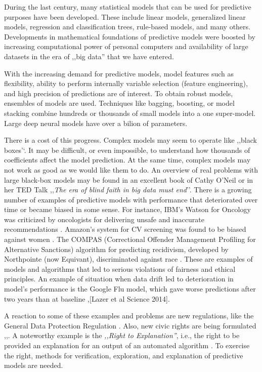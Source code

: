 \documentclass[12pt,]{krantz}
\theoremstyle{definition}
\theoremstyle{definition}
\theoremstyle{definition}
\theoremstyle{remark}
\begin{document}
During the last century, many statistical models that can be used for
predictive purposes have been developed. These include linear models,
generalized linear models, regression and classification trees,
rule-based models, and many others. Developments in mathematical
foundations of predictive models were boosted by increasing
computational power of personal computers and availability of large
datasets in the era of ,,big data'' that we have entered.

With the increasing demand for predictive models, model features such as
flexibility, ability to perform internally variable selection (feature
engineering), and high precision of predictions are of interest. To
obtain robust models, ensembles of models are used. Techniques like
bagging, boosting, or model stacking combine hundreds or thousands of
small models into a one super-model. Large deep neural models have over
a bilion of parameters.

There is a cost of this progress. Complex models may seem to operate
like ,,black boxes'`. It may be difficult, or even impossible, to
understand how thousands of coefficients affect the model prediction. At
the same time, complex models may not work as good as we would like them
to do. An overview of real problems with large black-box models may be
found in an excellent book of Cathy O'Neil \citep{ONeil} or in her TED
Talk ,,\emph{The era of blind faith in big data must end}''. There is a
growing number of examples of predictive models with performance that
deteriorated over time or became biased in some sense. For instance,
IBM's Watson for Oncology was criticized by oncologists for delivering
unsafe and inaccurate recommendations \citep{IBMWatson}. Amazon's system
for CV screening was found to be biased against women \citep{AmazonAI}.
The COMPAS (Correctional Offender Management Profiling for Alternative
Sanctions) algorithm for predicting recidivism, developed by Northpointe
(now Equivant), discriminated against race \citep{COMPAS}. These are
examples of models and algorithms that led to serious violations of
fairness and ethical principles. An example of situation when data drift
led to deterioration in model's performance is the Google Flu model,
which gave worse predictions after two years than at baseline
\citep{GoogleFLU},{[}Lazer et al Science 2014{]}.

A reaction to some of these examples and problems are new regulations,
like the General Data Protection Regulation \citep{EUGDPR}. Also, new
civic rights are being formulated
\citep{RightToExpl},\citep{RightToExpl2},\citep{RightToExpl3}. A
noteworthy example is the \emph{,,Right to Explanation''}, i.e., the
right to be provided an explanation for an output of an automated
algorithm \citep{RightToExpl}. To exercise the right, methods for
verification, exploration, and explanation of predictive models are
needed.
\end{document}
